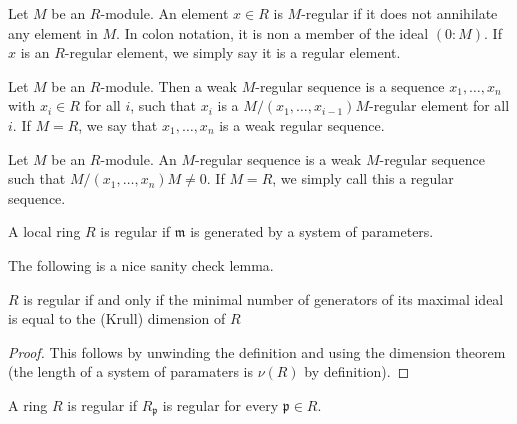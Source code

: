 \begin{definition}
  \label{def:reg_elt}
  Let $M$ be an $R$-module.
  An element $x \in R$ is $M$-regular if it does 
  not annihilate any element in $M$.
  In colon notation, it is non a member of the ideal
  $( 0 : M )$.
  If $x$ is an $R$-regular element, we simply say it is 
  a regular element.
\end{definition}

\begin{definition}
  \label{def:weak_reg_seq}
  Let $M$ be an $R$-module.
  Then a weak $M$-regular sequence
  is a sequence $x_1, \ldots, x_n$ 
  with $x_i \in R$ for all $i$,
  such that 
  $x_i$ is a
  $M / (x_1, \ldots, x_{i-1}) M$-regular
  element for all $i$.
  If $M = R$, we say that $x_1, \ldots, x_n$
  is a weak regular sequence. 
\end{definition}

\begin{definition}
  \label{def:reg_seq}
  Let $M$ be an $R$-module.
  An $M$-regular sequence is a weak $M$-regular sequence
  such that $M / (x_1, \ldots, x_n) M \neq 0$.
  If $M = R$, we simply call this a regular sequence.
\end{definition}


\begin{definition}
  \label{def:reg_loc}
  A local ring $R$ is regular if 
  $\mathfrak{m}$ is generated by a system of parameters.
\end{definition}

The following is a nice sanity check lemma.

\begin{lemma}
    \label{lem:reg_maximal_dim_generators}
    \(R\) is regular if and only if 
    the minimal number of generators of its maximal
    ideal is equal to the (Krull) dimension of \(R\)
\end{lemma}

\begin{proof}
    This follows by unwinding the definition 
    and using the dimension theorem 
    (the length of a system of paramaters is \(\nu(R)\)
    by definition).
\end{proof}

\begin{definition}
  \label{def:reg_ring}
  A ring $R$ is regular if 
  $R_{\mathfrak{p}}$ is regular
  for every $\mathfrak{p} \in R$.
\end{definition}

